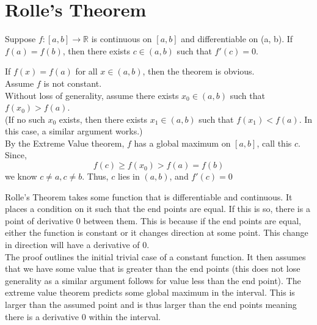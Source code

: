 \documentclass[12pt]{article}
\begin{document}
\section{Rolle's Theorem}
\begin{theo}{}
    Suppose $f: [a, b] \rightarrow \mathbb R$ is continuous on $[a, b]$ and differentiable on (a, b). If $f(a) = f(b)$, then there exists $c \in (a, b)$ such that $f'(c) = 0$.\\
\end{theo}
\begin{prf}{}
    If $f(x) = f(a)$ for all $x \in (a, b)$, then the theorem is obvious. \\Assume $f$ is not constant.\\ Without loss of generality, assume there exists $x_0 \in (a, b)$ such that $f(x_0) > f(a)$. \\(If no such $x_0$ exists, then there exists $x_1 \in (a, b)$ such that $f(x_1) < f(a)$. In this case, a similar argument works.)\\
    By the Extreme Value theorem, $f$ has a global maximum on $[a, b]$, call this $c$. Since,\\ $$f(c) \ge f(x_0) > f(a) = f(b)$$ we know $c \neq a, c \neq b$. Thus, $c$ lies in $(a, b)$, and $f'(c) = 0$
\end{prf}
\begin{explanation}{}
    Rolle's Theorem takes some function that is differentiable and continuous. It places a condition on it such that the end points are equal. If this is so, there is a point of derivative 0 between them. This is because if the end points are equal, either the function is constant or it changes direction at some point. This change in direction will have a derivative of 0.\\
    The proof outlines the initial trivial case of a constant function. It then assumes that we have some value that is greater than the end points (this does not lose generality as a similar argument follows for value less than the end point). The extreme value theorem predicts some global maximum in the interval. This is larger than the assumed point and is thus larger than the end points meaning there is a derivative 0 within the interval.
\end{explanation}




\newpage
\end{document}
